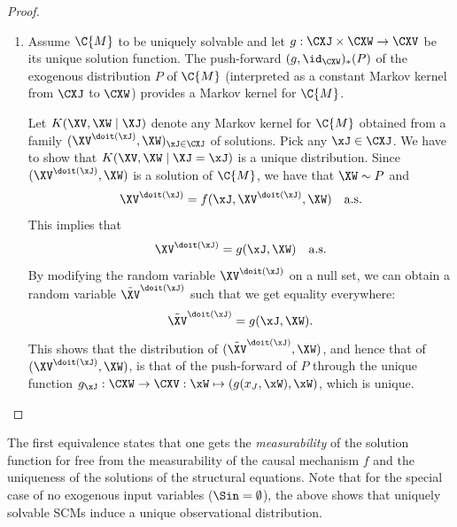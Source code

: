 \begin{proof}
\begin{enumerate}
\item
  Assume $\C{M}$ to be uniquely solvable and let $g : \CXJ \times \CXW \to \CXV$ be its unique solution function.
  The push-forward $(g,\id_{\CXW})_*(P)$ of the exogenous distribution $P$ of $\C{M}$ (interpreted as a constant 
  Markov kernel from $\CXJ$ to $\CXW$) provides a Markov kernel for $\C{M}$.
  
  Let $K(\XV,\XW \mid \XJ)$ denote any Markov kernel for $\C{M}$ obtained from a family
  $(\XV^{\doit(\xJ)},\XW)_{\xJ\in\CXJ}$ of solutions. Pick any $\xJ\in\CXJ$. We have to show that
  $K(\XV,\XW \mid \XJ=\xJ)$ is a unique distribution.
  Since $(\XV^{\doit(\xJ)},\XW)$ is a solution of $\C{M}$, we have that $\XW \sim P$ and
  $$\XV^{\doit(\xJ)} = f(\xJ,\XV^{\doit(\xJ)},\XW) \quad\text{a.s.}$$
  This implies that
  $$\XV^{\doit(\xJ)} = g(\xJ,\XW) \quad\text{a.s.}$$
  By modifying the random variable $\XV^{\doit(\xJ)}$ on a null set, we can obtain a random variable $\tilde{\XV}^{\doit(\xJ)}$ such that we get equality everywhere:
  $$\tilde{\XV}^{\doit(\xJ)} = g(\xJ,\XW).$$
  This shows that the distribution of $(\tilde{\XV}^{\doit(\xJ)},\XW)$, and hence that of $(\XV^{\doit(\xJ)},\XW)$, 
  is that of the push-forward of $P$ through the unique function
  $g_{\xJ} : \CXW \to \CXV : \xW \mapsto (g(x_J,\xW),\xW)$, which is unique.
  \end{enumerate}
\end{proof}
The first equivalence states that one gets the \emph{measurability}
of the solution function for free from the measurability of the causal mechanism $f$ and 
the uniqueness of the solutions of the structural equations.
Note that for the special case of no exogenous input variables ($\Sin = \emptyset$), 
the above shows that uniquely solvable SCMs induce a unique observational distribution.

